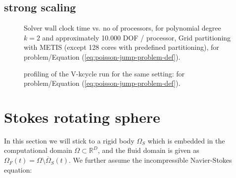 \documentclass[a4paper,10pt]{report} %
\begin{document}
\subsection{strong scaling}

\graphicspath{{./apdx-MPISolverPerformance/strongScaling/XdgPoisson/plots/}} 
\begin{figure}[h!]
	\begin{center}
		
	\end{center}
	\caption{
		Solver wall clock time vs. no of processors, for polynomial degree $k=2$ and approximately 10.000 DOF / processor, Grid partitioning with METIS (except 128 cores with predefined partitioning),
		for problem/Equation (\ref{eq:poisson-jump-problem-def}).
	}
	\label{fig:weakXdgPoissonScaling}
\end{figure}

\begin{figure}[h!]
	\begin{center}
		
	\end{center}
	\caption{
		profiling of the V-kcycle run for the same setting:
		for problem/Equation (\ref{eq:poisson-jump-problem-def}).
	}
	\label{fig:weakXdgPoisson-kcycle-profiling}
\end{figure}


\section{Stokes rotating sphere}
In this section we will stick to a rigid body $\Omega_S$ which is embedded in the computational domain $\Omega \subset \mathbb{R}^D$, and the fluid domain is given as 
$\Omega_F(t)=\Omega \setminus \overline{\Omega}_S(t)$.
We further assume the incompressible Navier-Stokes equation:
\end{document}
